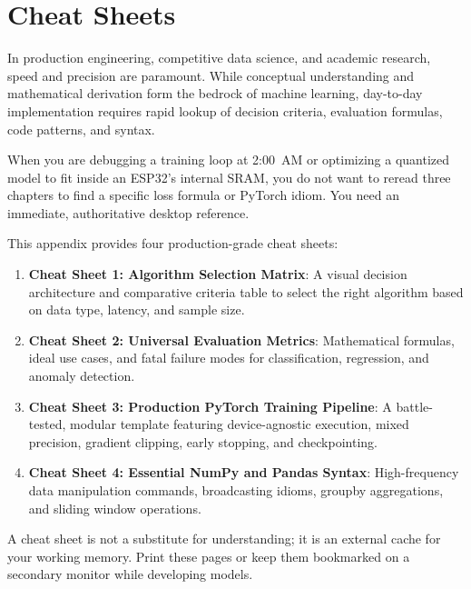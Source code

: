 \chapter{Cheat Sheets}\label{app:cheatsheets}

In production engineering, competitive data science, and academic research, speed and precision are paramount. While conceptual understanding and mathematical derivation form the bedrock of machine learning, day-to-day implementation requires rapid lookup of decision criteria, evaluation formulas, code patterns, and syntax.

When you are debugging a training loop at 2:00~AM or optimizing a quantized model to fit inside an ESP32's internal SRAM, you do not want to reread three chapters to find a specific loss formula or PyTorch idiom. You need an immediate, authoritative desktop reference.

This appendix provides four production-grade cheat sheets:
\begin{enumerate}
    \item \textbf{Cheat Sheet 1: Algorithm Selection Matrix}: A visual decision architecture and comparative criteria table to select the right algorithm based on data type, latency, and sample size.
    \item \textbf{Cheat Sheet 2: Universal Evaluation Metrics}: Mathematical formulas, ideal use cases, and fatal failure modes for classification, regression, and anomaly detection.
    \item \textbf{Cheat Sheet 3: Production PyTorch Training Pipeline}: A battle-tested, modular template featuring device-agnostic execution, mixed precision, gradient clipping, early stopping, and checkpointing.
    \item \textbf{Cheat Sheet 4: Essential NumPy and Pandas Syntax}: High-frequency data manipulation commands, broadcasting idioms, groupby aggregations, and sliding window operations.
\end{enumerate}

\begin{keyidea}
A cheat sheet is not a substitute for understanding; it is an external cache for your working memory. Print these pages or keep them bookmarked on a secondary monitor while developing models.
\end{keyidea}

